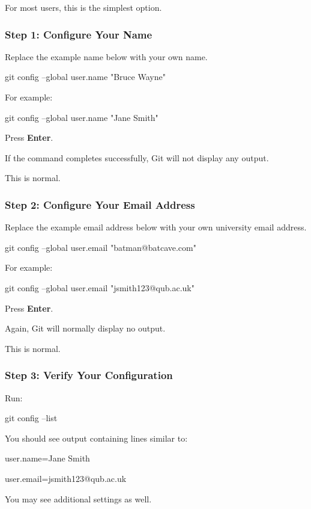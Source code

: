 \documentclass{csc2059practical}
\begin{document}
For most users, this is the simplest option.

\subsubsection{Step 1: Configure Your Name}
Replace the example name below with your own name.

\begin{terminalplain}
git config --global user.name "Bruce Wayne"
\end{terminalplain}
For example:

\begin{terminalplain}
git config --global user.name "Jane Smith"
\end{terminalplain}
Press \textbf{Enter}.

If the command completes successfully, Git will not display any output.

This is normal.

\subsubsection{Step 2: Configure Your Email Address}
Replace the example email address below with your own university email address.

\begin{terminalplain}
git config --global user.email "batman@batcave.com"
\end{terminalplain}
For example:

\begin{terminalplain}
git config --global user.email "jsmith123@qub.ac.uk"
\end{terminalplain}
Press \textbf{Enter}.

Again, Git will normally display no output.

This is normal.

\subsubsection{Step 3: Verify Your Configuration}
Run:

\begin{terminalplain}
git config --list
\end{terminalplain}
You should see output containing lines similar to:

\begin{terminalplain}
user.name=Jane Smith
\end{terminalplain}
\begin{terminalplain}
user.email=jsmith123@qub.ac.uk
\end{terminalplain}
You may see additional settings as well.
\end{document}
